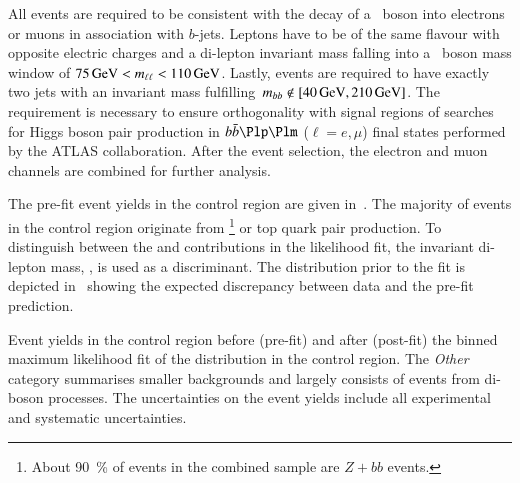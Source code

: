 All events are required to be consistent with the decay of a \PZ~boson into
electrons or muons in association with $b$-jets. Leptons have to be of the same
flavour with opposite electric charges and a di-lepton invariant mass falling
into a \PZ~boson mass window of $\SI{75}{\ensuremath{\text{GeV}}} < m_{\ell\ell} < \SI{110}{\ensuremath{\text{GeV}}}$. Lastly,
events are required to have exactly two \btagged jets with an invariant mass
fulfilling~\mbox{$\mBB \not\in [\SI{40}{\GeV}, \SI{210}{\GeV}]$}. The \mBB
requirement is necessary to ensure orthogonality with signal regions of searches
for Higgs boson pair production in $\bbbar\Plp\Plm$ ($\ell = e, \mu$) final
states performed by the ATLAS collaboration.
After the event selection, the electron and muon channels are combined for
further analysis.

The pre-fit event yields in the \ZHF control region are given
in~. The majority of events in the control region originate
from \ZHF\footnote{About \SI{90}{\percent} of events in the combined \ZHF sample
  are $Z + bb$ events.} or top quark pair production.
To distinguish between the \ZHF and \ttbar contributions in the likelihood fit,
the invariant di-lepton mass, \mll, is used as a discriminant. The \mll
distribution prior to the fit is depicted in~ showing
the expected discrepancy between data and the pre-fit prediction.

\begin{table}[htbp]
  \centering

  \caption{Event yields in the \ZHF control region before (pre-fit) and after
    (post-fit) the binned maximum likelihood fit of the \mll distribution in the
    control region. The \emph{Other} category summarises smaller backgrounds and
    largely consists of events from di-boson processes. The uncertainties on the
    event yields include all experimental and systematic uncertainties.}%
  \label{tab:zcr_yields}

  
\end{table}

